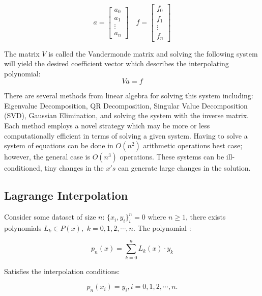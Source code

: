 \documentclass[11pt]{article}%
\begin{document}
\begin{equation}
a = \begin{bmatrix} a_0\\a_1\\ \vdots\\a_n\end{bmatrix}
\quad %
f = \begin{bmatrix} f_0\\f_1\\ \vdots\\f_n\end{bmatrix}
\end{equation}
%

The matrix $V$ is called the Vandermonde matrix and solving the following system will yield the desired coefficient vector which describes the interpolating polynomial:
\begin{equation}\label{DirectEq}
Va = f
\end{equation}

There are several methods from linear algebra for solving this system including: Eigenvalue Decomposition, QR Decomposition, Singular Value Decomposition (SVD), Gaussian Elimination, and solving the system with the inverse matrix. Each method employs a novel strategy which may be more or less computationally efficient in terms of solving a given system. Having to solve a system of equations can be done in $O(n^2)$ arithmetic operations best case; however, the general case is $O(n^3)$ operations. These systems can be ill-conditioned, tiny changes in the $x's$ can generate large changes in the solution.

\subsection{Lagrange Interpolation}

Consider some dataset of size $n$: $\{x_i,y_i\}^n_i=0$ where $n \geq 1$, there exists polynomials $L_k \in P(x),$ $k = 0,1,2,\cdots, n$. The polynomial \cite{LHK3}:

\begin{equation}
p_n(x) = \sum_{k=0}^{n} L_k(x)\cdot y_k
\end{equation}

Satisfies the interpolation conditions:

\begin{equation}
p_n(x_i) = y_i, i = 0, 1, 2, \cdots, n.
\end{equation}
\end{document}
